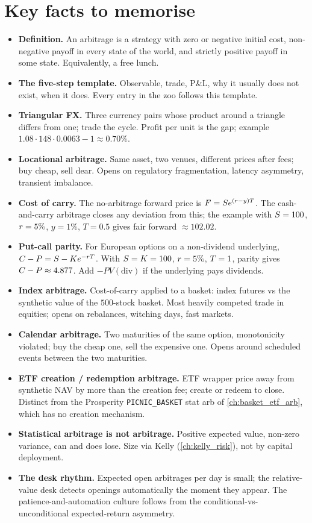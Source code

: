\section{Key facts to memorise}
\label{sec:ch13_keyfacts}

\begin{itemize}
  \item \textbf{Definition.} An arbitrage is a strategy with
  zero or negative initial cost, non-negative payoff in every
  state of the world, and strictly positive payoff in some
  state. Equivalently, a free lunch.
  \item \textbf{The five-step template.} Observable, trade,
  P\&L, why it usually does not exist, when it does. Every
  entry in the zoo follows this template.
  \item \textbf{Triangular FX.} Three currency pairs whose
  product around a triangle differs from one; trade the cycle.
  Profit per unit is the gap; example $1.08 \cdot 148 \cdot
  0.0063 - 1 \approx 0.70\%$.
  \item \textbf{Locational arbitrage.} Same asset, two venues,
  different prices after fees; buy cheap, sell dear. Opens on
  regulatory fragmentation, latency asymmetry, transient
  imbalance.
  \item \textbf{Cost of carry.} The no-arbitrage forward price
  is $F = S e^{(r - y) T}$. The cash-and-carry arbitrage
  closes any deviation from this; the example with $S =
  100$, $r = 5\%$, $y = 1\%$, $T = 0.5$ gives fair forward
  $\approx 102.02$.
  \item \textbf{Put-call parity.} For European options on a
  non-dividend underlying, $C - P = S - K
  e^{-r T}$. With $S = K = 100$, $r = 5\%$,
  $T = 1$, parity gives $C - P \approx 4.877$. Add
  $-PV(\text{div})$ if the underlying pays dividends.
  \item \textbf{Index arbitrage.} Cost-of-carry applied to a
  basket: index futures vs the synthetic value of the
  $500$-stock basket. Most heavily competed trade in equities;
  opens on rebalances, witching days, fast markets.
  \item \textbf{Calendar arbitrage.} Two maturities of the
  same option, monotonicity violated; buy the cheap one, sell
  the expensive one. Opens around scheduled events between
  the two maturities.
  \item \textbf{ETF creation / redemption arbitrage.} ETF
  wrapper price away from synthetic NAV by more than the
  creation fee; create or redeem to close. Distinct from the
  Prosperity \texttt{PICNIC\_BASKET} stat arb of
  \cref{ch:basket_etf_arb}, which has no creation mechanism.
  \item \textbf{Statistical arbitrage is not arbitrage.}
  Positive expected value, non-zero variance, can and does
  lose. Size via Kelly (\cref{ch:kelly_risk}), not by capital
  deployment.
  \item \textbf{The desk rhythm.} Expected open arbitrages per
  day is small; the relative-value desk detects openings
  automatically the moment they appear. The
  patience-and-automation culture follows from the
  conditional-vs-unconditional expected-return asymmetry.
\end{itemize}

